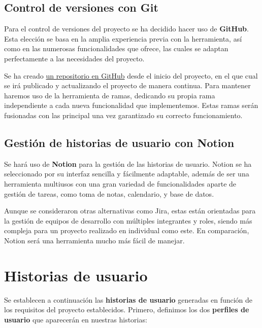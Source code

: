 \subsection{Control de versiones con Git} 

Para el control de versiones del proyecto se ha decidido hacer uso de \textbf{GitHub}. Esta elección se basa en la amplia experiencia previa con la herramienta, así como en las numerosas funcionalidades que ofrece, las cuales se adaptan perfectamente a las necesidades del proyecto. 

Se ha creado \href{https://github.com/Pabluwu707/TFG-UGR}{un repositorio en GitHub} desde el inicio del proyecto, en el que cual se irá publicado y actualizando el proyecto de manera continua. Para mantener haremos uso de la herramienta de ramas, dedicando su propia rama independiente a cada nueva funcionalidad que implementemos. Estas ramas serán fusionadas con las principal una vez garantizado su correcto funcionamiento.

\subsection{Gestión de historias de usuario con Notion}

Se hará uso de \textbf{Notion}\cite{notion} para la gestión de las historias de usuario. Notion se ha seleccionado por su interfaz sencilla y fácilmente adaptable, además de ser una herramienta multiusos con una gran variedad de funcionalidades aparte de gestión de tareas, como toma de notas, calendario, y base de datos.

Aunque se consideraron otras alternativas como Jira\cite{jira}, estas están orientadas para la gestión de equipos de desarrollo con múltiples integrantes y roles, siendo más compleja para un proyecto realizado en individual como este. En comparación, Notion será una herramienta mucho más fácil de manejar.
 
\section{Historias de usuario}

Se establecen a continuación las \textbf{historias de usuario} generadas en función de los requisitos del proyecto establecidos. Primero, definimos los dos \textbf{perfiles de usuario} que aparecerán en nuestras historias:

